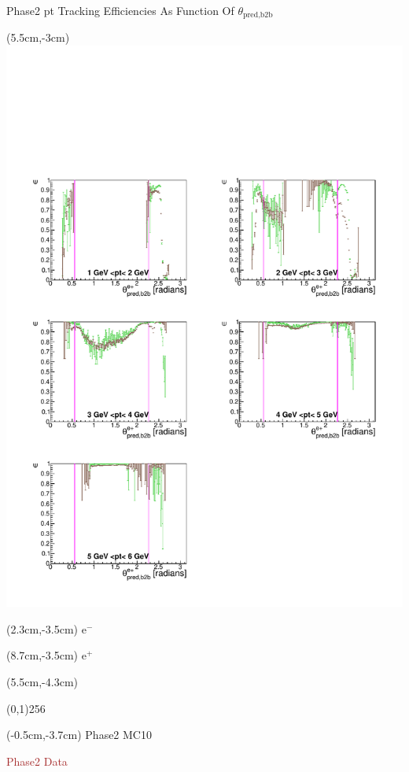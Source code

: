 \documentclass[8pt]{beamer}
\begin{document}
\begin{frame}{Phase2 pt Tracking Efficiencies As Function Of $\theta_{\textrm{pred,b2b}}$}
	\begin{textblock*}{6.5cm}(5.5cm,-3cm)
		\includegraphics[width=\textwidth]{VPlots/P2/xPtMThetaep}
	\end{textblock*}
	
	
	\begin{textblock*}{2cm}(2.3cm,-3.5cm)
		$\textrm{e}^-$
	\end{textblock*}
	
	\begin{textblock*}{2cm}(8.7cm,-3.5cm)
		$\textrm{e}^+$
	\end{textblock*}
	
	
	
	\begin{textblock*}{11cm}(5.5cm,-4.3cm)
		
		\begin{center}
			\line(0,1){256}
		\end{center}
		
	\end{textblock*}
	
	\begin{textblock*}{4cm}(-0.5cm,-3.7cm)
		\textcolor{OliveGreen}{Phase2 MC10}
		
		\textcolor{brown}{Phase2 Data}
	\end{textblock*}
	
	
	
	
	
\end{frame}
\end{document}
